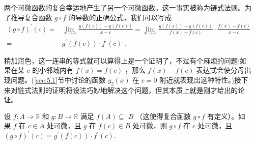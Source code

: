 两个可微函数的复合幸运地产生了另一个可微函数。这一事实被称为链式法则。为了推导复合函数 \(g \circ  f\) 的导数的正确公式，我们可以写成
\begin{align*}
{\left(g \circ  f\right) }^{\prime }\left( c\right)  = &\mathop{\lim }\limits_{{x \rightarrow  c}}\frac{g\left( {f\left( x\right) }\right)  - g\left( {f\left( c\right) }\right) }{x - c} = \mathop{\lim }\limits_{{x \rightarrow  c}}\frac{g\left( {f\left( x\right) }\right)  - g\left( {f\left( c\right) }\right) }{f\left( x\right)  - f\left( c\right) } \cdot  \frac{f\left( x\right)  - f\left( c\right) }{x - c}\\
=& {g}^{\prime }\left( {f\left( c\right) }\right)  \cdot  {f}^{\prime }\left( c\right) \text{ . }
\end{align*}


稍加润色，这一连串的等式就可以算得上是一个证明了，不过有个麻烦的问题:如果在某 \(c\) 的小邻域内有 \(f\left( x\right)  = f\left( c\right)\) ，那么 \(f\left( x\right)  - f\left( c\right)\) 表达式会使分母出现问题。(\ref{sec:5.1}节中讨论的函数 \({g}_{2}\left( x\right)\) 在 \(c = 0\) 附近就表现出这种特性。)接下来对链式法则的证明将设法巧妙地解决这个问题，但其本质上就是刚才给出的论证。

\begin{Thm}\label{thm:5.2.5}
  设 \(f : A \rightarrow  \mathbb{R}\) 和 \(g : B \rightarrow  \mathbb{R}\) 满足 \(f\left( A\right)  \subseteq\)  \(B\) （这使得复合函数 \(g \circ  f\) 有定义）。如果 \(f\) 在 \(c \in  A\) 处可微，且 \(g\) 在 \(f\left( c\right)  \in  B\) 处可微，则 \(g \circ  f\) 在 \(c\) 处可微，且 \({\left( g \circ  f\right) }^{\prime }\left( c\right)  = {g}^{\prime }\left( {f\left( c\right) }\right)  \cdot  {f}^{\prime }\left( c\right) .\)
\end{Thm}


